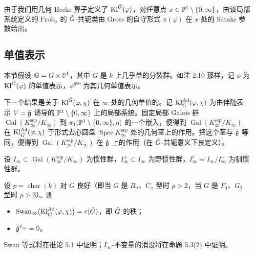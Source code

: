 由于我们用几何 Hecke 算子定义了 $\mathrm{Kl}^{\check G}(\varphi)$，对任意点 $x\in\mathbb{P}^1\setminus\{0,\infty\}$，由该局部系统定义的 $\mathrm{Frob}_x$ 的 $\check G$-共轭类由 Gross 的自守形式 $\pi(\varphi)$ 在 $x$ 处的 Satake 参数给出。

\subsection{单值表示}

本节假设 $\mathbb{G}=G\times\mathbb{P}^1$，其中 $G$ 是 $k$ 上几乎单的分裂群。如注 2.10 那样，记 $\phi$ 为 $\mathrm{Kl}^{\check G}(\varphi)$ 的单值表示，$\phi^{\mathrm{geo}}$ 为其几何单值表示。

下一个结果是关于 $\mathrm{Kl}^{\check G}(\varphi,\chi)$ 在 $\infty$ 处的几何单值的。记 $\mathrm{Kl}^{\mathrm{Ad}}_{\check G}(\varphi,\chi)$ 为由伴随表示 $V=\check{\mathfrak g}$ 诱导的 $\mathbb{P}^1\setminus\{0,\infty\}$ 上的局部系统。固定局部 Galois 群 $\operatorname{Gal}(K^{\mathrm{sep}}_\infty/K_\infty)$ 到 $\pi_1(\mathbb{P}^1\setminus\{0,\infty\},\eta)$ 的一个嵌入，便得到 $\operatorname{Gal}(K^{\mathrm{sep}}_\infty/K_\infty)$ 在 $\mathrm{Kl}^{\mathrm{Ad}}_{\check G}(\varphi,\chi)$ 于形式去心圆盘 $\operatorname{Spec}K^{\mathrm{sep}}_\infty$ 处的几何茎上的作用。把这个茎与 $\check{\mathfrak g}$ 等同，便得到 $\operatorname{Gal}(K^{\mathrm{sep}}_\infty/K_\infty)$ 在 $\check{\mathfrak g}$ 上的作用（在 $\check G$-共轭意义下良定义）。

设 $I_\infty\subset\operatorname{Gal}(K^{\mathrm{sep}}_\infty/K_\infty)$ 为惯性群，$I^+_\infty\subset I_\infty$ 为野惯性群，$I^t_\infty=I_\infty/I^+_\infty$ 为驯惯性群。

\begin{mainthm}[2]
设 $p=\operatorname{char}(k)$ 对 $G$ 良好（即当 $G$ 是 $B_n$、$C_n$ 型时 $p>2$，当 $G$ 是 $F_4$、$G_2$ 型时 $p>3$）。则
\begin{itemize}[leftmargin=1.6em, itemsep=.2em]
\item $\mathrm{Swan}_\infty\big(\mathrm{Kl}^{\mathrm{Ad}}_{\check G}(\varphi,\chi)\big)=r(\check G)$，即 $\check G$ 的秩；
\item $\check{\mathfrak g}^{I_\infty}=0$。
\end{itemize}
\end{mainthm}

Swan 等式将在推论 5.1 中证明；$I_\infty$-不变量的消没将在命题 5.3(2) 中证明。

